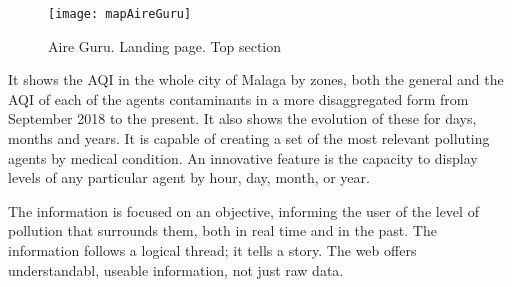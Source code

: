 \newpage
\begin{figure}[ht]
    \centering
    \texttt{[image: mapAireGuru]}
    \caption{Aire Guru. Landing page. Top section}
\end{figure}

It shows the AQI in the whole city of Malaga by zones, both the general and the AQI of each of the agents
contaminants in a more disaggregated form from September 2018 to the present. It also shows the evolution
of these for days, months and years.
It is capable of creating a set of the most relevant polluting agents by medical condition. An innovative feature is the capacity to display levels of any particular agent by hour, day, month, or year. 


\begin{itemize}
\done The information is focused on an objective, informing the user of the level of pollution that surrounds them, both  in real time
and in the past.
\done The information follows a logical thread; it tells a story.
\done The web offers understandabl, useable information, not just raw data.
\end{itemize}

\newpage